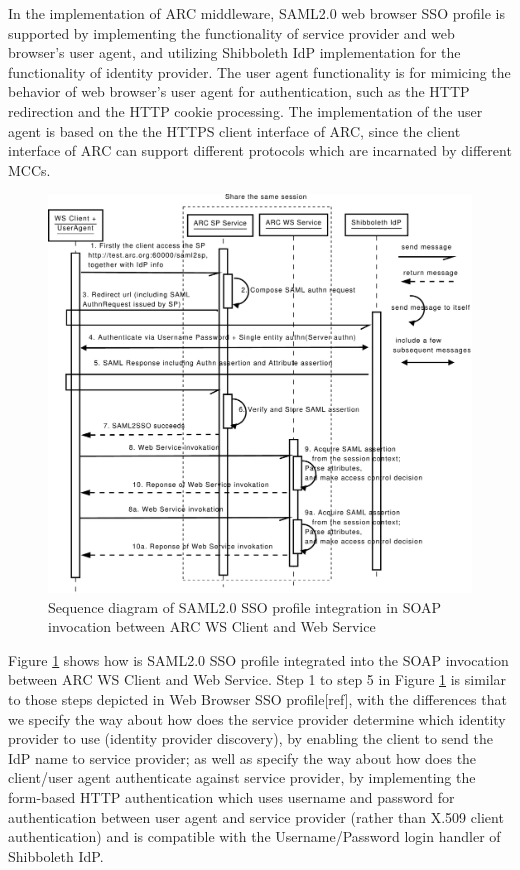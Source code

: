 \documentclass[conference]{IEEEtran}
\begin{document}
In the implementation of ARC middleware, SAML2.0 web browser SSO profile is supported by 
implementing the functionality of service provider and web browser's user agent, and utilizing 
Shibboleth IdP implementation for the functionality of identity provider. The user agent 
functionality is for mimicing the behavior of web browser's user agent for authentication, 
such as the HTTP redirection and the HTTP cookie processing. The implementation of the user 
agent is based on the the HTTPS client interface of ARC, since the client interface of ARC 
can support different protocols which are incarnated by different MCCs.

\begin{figure}
\includegraphics[width=1.0\columnwidth]{SAML2SSO_UML.pdf}
\caption{Sequence diagram of SAML2.0 SSO profile integration in SOAP invocation 
between ARC WS Client and Web Service}
\label{fig:SAML2SSOUML}
\end{figure}

Figure \ref{fig:SAML2SSOUML} shows how is SAML2.0 SSO profile integrated into the SOAP 
invocation between ARC WS Client and Web Service. Step 1 to step 5 in Figure \ref{fig:SAML2SSOUML} 
is similar to those steps depicted in Web Browser SSO profile[ref], with the differences that
we specify the way about how does the service provider determine which identity provider to use (identity
provider discovery), by enabling the client to send the IdP name to service provider; as well 
as specify the way about how does the client/user agent authenticate against service provider, 
by implementing the form-based HTTP authentication which uses username and password for authentication between 
user agent and service provider (rather than X.509 client authentication) and is compatible 
with the Username/Password login handler of Shibboleth IdP.
\end{document}
